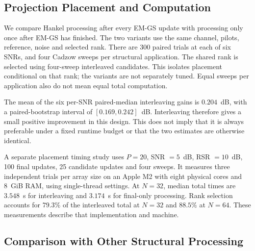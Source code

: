 \documentclass[journal]{IEEEtran}
\begin{document}
\subsection{Projection Placement and Computation}
\label{sec:placement}

We compare Hankel processing after every EM-GS update with processing
only once after EM-GS has finished. The two variants use the same channel,
pilots, reference, noise and selected rank. There are 300 paired trials
at each of six SNRs, and four Cadzow sweeps per structural application.
The shared rank is selected using four-sweep interleaved candidates.
This isolates placement conditional on that rank; the variants are not
separately tuned. Equal sweeps per application also do not mean equal
total computation.

The mean of the six per-SNR paired-median interleaving gains is
$0.204$~dB, with a paired-bootstrap interval of $[0.169,0.242]$~dB.
Interleaving therefore gives a small positive improvement in this design.
This does not imply that it is always preferable under a fixed runtime
budget or that the two estimates are otherwise identical.

A separate placement timing study uses $P=20$, SNR $=5$~dB,
RSR $=10$~dB, 100 final updates, 25 candidate updates and four sweeps.
It measures three independent trials per array size on an Apple M2
with eight physical cores and 8~GiB RAM, using single-thread settings.
At $N=32$, median total times are $3.548$~s for interleaving and
$3.174$~s for final-only processing. Rank selection accounts for
$79.3\%$ of the interleaved total at $N=32$ and $88.5\%$ at $N=64$.
These measurements describe that implementation and machine.

\subsection{Comparison with Other Structural Processing}
\label{sec:revision-structured-comparisons}
\end{document}
